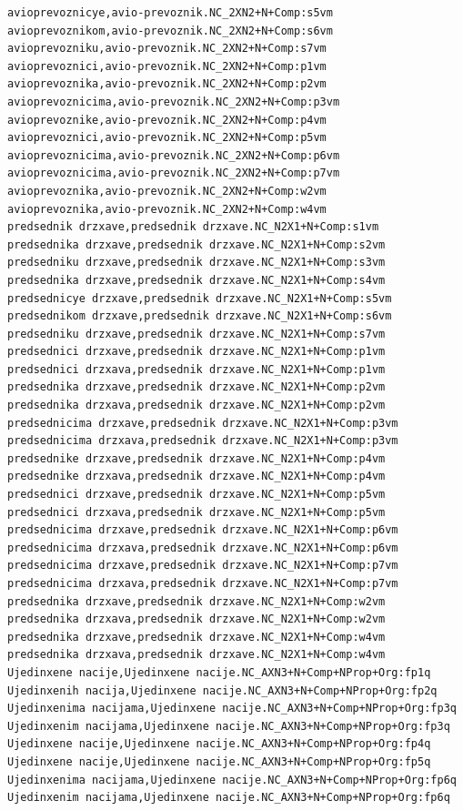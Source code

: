 \begin{verbatim}
avioprevoznicye,avio-prevoznik.NC_2XN2+N+Comp:s5vm
avioprevoznikom,avio-prevoznik.NC_2XN2+N+Comp:s6vm
avioprevozniku,avio-prevoznik.NC_2XN2+N+Comp:s7vm
avioprevoznici,avio-prevoznik.NC_2XN2+N+Comp:p1vm
avioprevoznika,avio-prevoznik.NC_2XN2+N+Comp:p2vm
avioprevoznicima,avio-prevoznik.NC_2XN2+N+Comp:p3vm
avioprevoznike,avio-prevoznik.NC_2XN2+N+Comp:p4vm
avioprevoznici,avio-prevoznik.NC_2XN2+N+Comp:p5vm
avioprevoznicima,avio-prevoznik.NC_2XN2+N+Comp:p6vm
avioprevoznicima,avio-prevoznik.NC_2XN2+N+Comp:p7vm
avioprevoznika,avio-prevoznik.NC_2XN2+N+Comp:w2vm
avioprevoznika,avio-prevoznik.NC_2XN2+N+Comp:w4vm
predsednik drzxave,predsednik drzxave.NC_N2X1+N+Comp:s1vm
predsednika drzxave,predsednik drzxave.NC_N2X1+N+Comp:s2vm
predsedniku drzxave,predsednik drzxave.NC_N2X1+N+Comp:s3vm
predsednika drzxave,predsednik drzxave.NC_N2X1+N+Comp:s4vm
predsednicye drzxave,predsednik drzxave.NC_N2X1+N+Comp:s5vm
predsednikom drzxave,predsednik drzxave.NC_N2X1+N+Comp:s6vm
predsedniku drzxave,predsednik drzxave.NC_N2X1+N+Comp:s7vm
predsednici drzxave,predsednik drzxave.NC_N2X1+N+Comp:p1vm
predsednici drzxava,predsednik drzxave.NC_N2X1+N+Comp:p1vm
predsednika drzxave,predsednik drzxave.NC_N2X1+N+Comp:p2vm
predsednika drzxava,predsednik drzxave.NC_N2X1+N+Comp:p2vm
predsednicima drzxave,predsednik drzxave.NC_N2X1+N+Comp:p3vm
predsednicima drzxava,predsednik drzxave.NC_N2X1+N+Comp:p3vm
predsednike drzxave,predsednik drzxave.NC_N2X1+N+Comp:p4vm
predsednike drzxava,predsednik drzxave.NC_N2X1+N+Comp:p4vm
predsednici drzxave,predsednik drzxave.NC_N2X1+N+Comp:p5vm
predsednici drzxava,predsednik drzxave.NC_N2X1+N+Comp:p5vm
predsednicima drzxave,predsednik drzxave.NC_N2X1+N+Comp:p6vm
predsednicima drzxava,predsednik drzxave.NC_N2X1+N+Comp:p6vm
predsednicima drzxave,predsednik drzxave.NC_N2X1+N+Comp:p7vm
predsednicima drzxava,predsednik drzxave.NC_N2X1+N+Comp:p7vm
predsednika drzxave,predsednik drzxave.NC_N2X1+N+Comp:w2vm
predsednika drzxava,predsednik drzxave.NC_N2X1+N+Comp:w2vm
predsednika drzxave,predsednik drzxave.NC_N2X1+N+Comp:w4vm
predsednika drzxava,predsednik drzxave.NC_N2X1+N+Comp:w4vm
Ujedinxene nacije,Ujedinxene nacije.NC_AXN3+N+Comp+NProp+Org:fp1q
Ujedinxenih nacija,Ujedinxene nacije.NC_AXN3+N+Comp+NProp+Org:fp2q
Ujedinxenima nacijama,Ujedinxene nacije.NC_AXN3+N+Comp+NProp+Org:fp3q
Ujedinxenim nacijama,Ujedinxene nacije.NC_AXN3+N+Comp+NProp+Org:fp3q
Ujedinxene nacije,Ujedinxene nacije.NC_AXN3+N+Comp+NProp+Org:fp4q
Ujedinxene nacije,Ujedinxene nacije.NC_AXN3+N+Comp+NProp+Org:fp5q
Ujedinxenima nacijama,Ujedinxene nacije.NC_AXN3+N+Comp+NProp+Org:fp6q
Ujedinxenim nacijama,Ujedinxene nacije.NC_AXN3+N+Comp+NProp+Org:fp6q

\end{verbatim}
